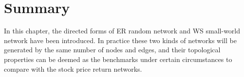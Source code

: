 \section{Summary}
In this chapter, the directed forms of ER random network and WS small-world network have been introduced. In practice these two kinds of networks will be generated by the same number of nodes and edges, and their topological properties can be deemed as the benchmarks under certain circumstances to compare with the stock price return networks.
